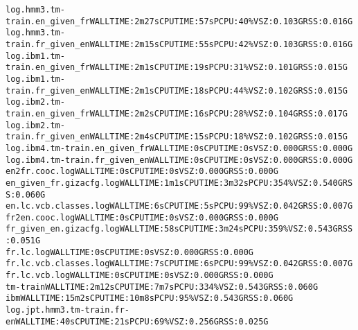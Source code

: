 \documentclass[11pt,letterpaper]{article}
\begin{document}
\begin{tiny}
\begin{alltt}
         log.hmm3.tm-train.en_given_fr                    WALL TIME: 2m27s    CPU TIME: 57s       PCPU: 40\%    VSZ: 0.103G    RSS: 0.016G
         log.hmm3.tm-train.fr_given_en                    WALL TIME: 2m15s    CPU TIME: 55s       PCPU: 42\%    VSZ: 0.103G    RSS: 0.016G
         log.ibm1.tm-train.en_given_fr                    WALL TIME: 2m1s     CPU TIME: 19s       PCPU: 31\%    VSZ: 0.101G    RSS: 0.015G
         log.ibm1.tm-train.fr_given_en                    WALL TIME: 2m1s     CPU TIME: 18s       PCPU: 44\%    VSZ: 0.102G    RSS: 0.015G
         log.ibm2.tm-train.en_given_fr                    WALL TIME: 2m2s     CPU TIME: 16s       PCPU: 28\%    VSZ: 0.104G    RSS: 0.017G
         log.ibm2.tm-train.fr_given_en                    WALL TIME: 2m4s     CPU TIME: 15s       PCPU: 18\%    VSZ: 0.102G    RSS: 0.015G
         log.ibm4.tm-train.en_given_fr                    WALL TIME: 0s       CPU TIME: 0s                     VSZ: 0.000G    RSS: 0.000G
         log.ibm4.tm-train.fr_given_en                    WALL TIME: 0s       CPU TIME: 0s                     VSZ: 0.000G    RSS: 0.000G
            en2fr.cooc.log                                WALL TIME: 0s       CPU TIME: 0s                     VSZ: 0.000G    RSS: 0.000G
            en_given_fr.gizacfg.log                       WALL TIME: 1m1s     CPU TIME: 3m32s     PCPU: 354\%   VSZ: 0.540G    RSS: 0.060G
            en.lc.vcb.classes.log                         WALL TIME: 6s       CPU TIME: 5s        PCPU: 99\%    VSZ: 0.042G    RSS: 0.007G
            fr2en.cooc.log                                WALL TIME: 0s       CPU TIME: 0s                     VSZ: 0.000G    RSS: 0.000G
            fr_given_en.gizacfg.log                       WALL TIME: 58s      CPU TIME: 3m24s     PCPU: 359\%   VSZ: 0.543G    RSS: 0.051G
            fr.lc.log                                     WALL TIME: 0s       CPU TIME: 0s                     VSZ: 0.000G    RSS: 0.000G
            fr.lc.vcb.classes.log                         WALL TIME: 7s       CPU TIME: 6s        PCPU: 99\%    VSZ: 0.042G    RSS: 0.007G
            fr.lc.vcb.log                                 WALL TIME: 0s       CPU TIME: 0s                     VSZ: 0.000G    RSS: 0.000G
         tm-train                                         WALL TIME: 2m12s    CPU TIME: 7m7s      PCPU: 334\%   VSZ: 0.543G    RSS: 0.060G
      ibm                                                 WALL TIME: 15m2s    CPU TIME: 10m8s     PCPU: 95\%    VSZ: 0.543G    RSS: 0.060G
         log.jpt.hmm3.tm-train.fr-en                      WALL TIME: 40s      CPU TIME: 21s       PCPU: 69\%    VSZ: 0.256G    RSS: 0.025G

\end{alltt}
\end{tiny}
\end{document}
